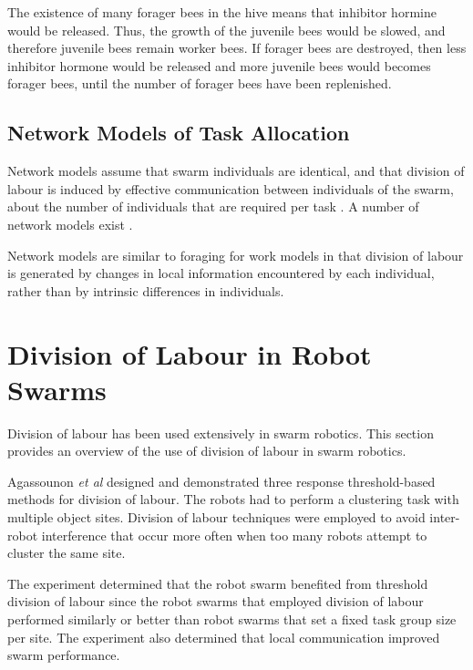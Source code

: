 The existence of many forager bees in the hive means that inhibitor hormine would be released. Thus, the growth of the juvenile bees would be slowed, and therefore juvenile bees remain worker bees. If forager bees are destroyed, then less inhibitor hormone would be released and more juvenile bees would becomes forager bees, until the number of forager bees have been replenished.

                                
\subsection{Network Models of Task Allocation}
\label{networkmodels}

Network models assume that swarm individuals are identical, and that division of labour is induced by effective communication between individuals of the swarm, about the number of individuals that are required per task \cite{gordon1992parallel}. A number of network models exist \cite{gordon1992parallel,pacala1996effects}.

Network models are similar to foraging for work models in that division of labour is generated by changes in local information encountered by each individual, rather than by intrinsic differences in individuals. 


\section{Division of Labour in Robot Swarms}
\label{background:divisionoflabour:robotswarm}
Division of labour has been used extensively in swarm robotics. This section provides an overview of the use of division of labour in swarm robotics.

Agassounon \textit{et al} \cite{agassounon2002efficiency} designed and demonstrated three response threshold-based methods for division of labour. The robots had to perform a clustering task with multiple object sites. Division of labour techniques were employed to avoid inter-robot interference that occur more often when too many robots attempt to cluster the same site. 

The experiment determined that the robot swarm benefited from threshold division of labour since the robot swarms that employed division of labour performed similarly or better than robot swarms that set a fixed task group size per site. The experiment also determined that local communication improved swarm performance.

